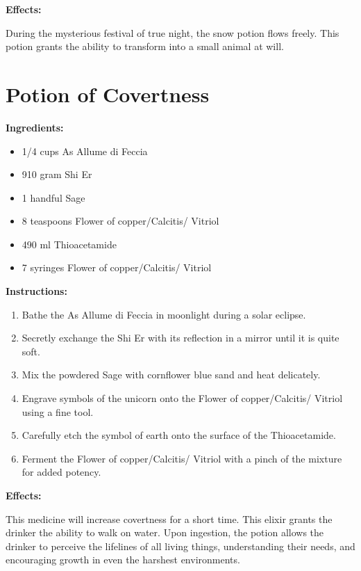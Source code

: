 \documentclass{article}
\begin{document}
\textbf{Effects:}

During the mysterious festival of true night, the snow potion flows freely. This potion grants the ability to transform into a small animal at will.

\newpage
\section*{Potion of Covertness}

\textbf{Ingredients:}

\begin{itemize}
  \item 1/4 cups As Allume di Feccia
  \item 910 gram Shi Er
  \item 1 handful Sage
  \item 8 teaspoons Flower of copper/Calcitis/ Vitriol
  \item 490 ml Thioacetamide
  \item 7 syringes Flower of copper/Calcitis/ Vitriol
\end{itemize}

\textbf{Instructions:}

\begin{enumerate}
  \item Bathe the As Allume di Feccia in moonlight during a solar eclipse.
  \item Secretly exchange the Shi Er with its reflection in a mirror until it is quite soft.
  \item Mix the powdered Sage with cornflower blue sand and heat delicately.
  \item Engrave symbols of the unicorn onto the Flower of copper/Calcitis/ Vitriol using a fine tool.
  \item Carefully etch the symbol of earth onto the surface of the Thioacetamide.
  \item Ferment the Flower of copper/Calcitis/ Vitriol with a pinch of the mixture for added potency.
\end{enumerate}

\textbf{Effects:}

This medicine will increase covertness for a short time. This elixir grants the drinker the ability to walk on water. Upon ingestion, the potion allows the drinker to perceive the lifelines of all living things, understanding their needs, and encouraging growth in even the harshest environments.
\end{document}
